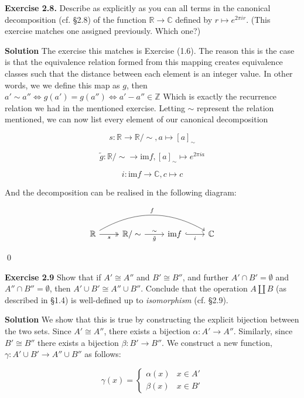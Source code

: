 \documentclass[titlepage]{article}
\begin{document}
\textbf{Exercise 2.8.} Describe as explicitly as you can all terms in the canonical decomposition (cf. \S 2.8)
 of the function $\mathbb{R} \to \mathbb{C}$ defined by $r \mapsto e^{2 \pi i r}$. (This exercise matches one assigned previously. Which one?)

\medskip

\textbf{Solution} The exercise this matches is Exercise (1.6). The reason this is the case is that the equivalence relation formed from this mapping creates equivalence classes such that the distance between each element is an integer value. In other words, we we define this map as $g$, then $a' \sim a'' \iff g(a')=g(a'') \iff a'-a'' \in \mathbb{Z}$ Which is exactly the recurrence relation we had in the mentioned exercise. Letting $\sim$ represent the relation mentioned, we can now list every element of our canonical decomposition

\[ s:\mathbb{R} \to \mathbb{R} / \sim, a \mapsto [a]_{\sim} \]

\[ \tilde{g}: \mathbb{R} / \sim \to \text{im} f, [a]_{\sim} \mapsto e^{2 \pi i a} \] 

\[ i: \text{im} f \to \mathbb{C}, c \mapsto c \]

And the decomposition can be realised in the following diagram:

\[
\begin{tikzcd}
\mathbb{R} \arrow[r,twoheadrightarrow, "s" below,] \arrow[rrr,"f",bend left=30] & \mathbb{R} /\sim \arrow[r,"\sim" above,"\tilde{g}" below] &  \text{im} f \arrow[r,hook,"i" below] & \mathbb{C}
\end{tikzcd}
\]

\qed

\bigskip

\textbf{Exercise 2.9} Show that if $A' \cong A''$ and $B' \cong B''$, and further $A' \cap B' = \emptyset$ and $A'' \cap B'' = \emptyset$, then $A' \cup B' \cong A'' \cup B''$. Conclude that the operation $A \amalg B$ (as described in \S 1.4) is well-defined up to \textit{isomorphism} (cf. \S 2.9).

\medskip

\textbf{Solution} We show that this is true by constructing the explicit bijection between the two sets. Since $A' \cong A''$, there exists a bijection $\alpha: A' \to A''$. Similarly, since $B' \cong B''$ there exists a bijection $\beta: B' \to B''$. We construct a new function, $\gamma:A' \cup B' \to A'' \cup B''$ as follows:


\[ \gamma(x) = \begin{cases}
\alpha(x) & x \in A' \\ \beta(x) & x \in B'
\end{cases} \]
\end{document}
